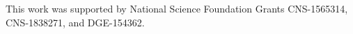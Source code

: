 \documentclass[manuscript]{acmart}
\begin{document}

\begin{acks}
This work was supported by National Science Foundation Grants
CNS-1565314, CNS-1838271, and DGE-154362.
\end{acks}



\end{document}
